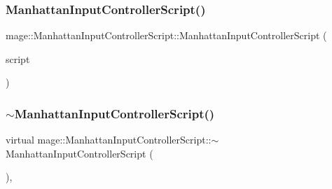 \hypertarget{classmage_1_1_manhattan_input_controller_script_ad17804aa997c9adb3cbecb2a6bfbfda3}{}\label{classmage_1_1_manhattan_input_controller_script_ad17804aa997c9adb3cbecb2a6bfbfda3} 
\subsubsection{\texorpdfstring{Manhattan\+Input\+Controller\+Script()}{ManhattanInputControllerScript()}\hspace{0.1cm}{\footnotesize\ttfamily [3/3]}}
{\footnotesize\ttfamily mage\+::\+Manhattan\+Input\+Controller\+Script\+::\+Manhattan\+Input\+Controller\+Script (\begin{DoxyParamCaption}\item[{\hyperlink{classmage_1_1_manhattan_input_controller_script}{Manhattan\+Input\+Controller\+Script} \&\&}]{script }\end{DoxyParamCaption})\hspace{0.3cm}{\ttfamily [default]}}

\hypertarget{classmage_1_1_manhattan_input_controller_script_ae4adff57a2d77647ab0b7b89d7bda6d0}{}\label{classmage_1_1_manhattan_input_controller_script_ae4adff57a2d77647ab0b7b89d7bda6d0} 
\subsubsection{\texorpdfstring{$\sim$\+Manhattan\+Input\+Controller\+Script()}{~ManhattanInputControllerScript()}}
{\footnotesize\ttfamily virtual mage\+::\+Manhattan\+Input\+Controller\+Script\+::$\sim$\+Manhattan\+Input\+Controller\+Script (\begin{DoxyParamCaption}{ }\end{DoxyParamCaption})\hspace{0.3cm}{\ttfamily [virtual]}, {\ttfamily [default]}}



